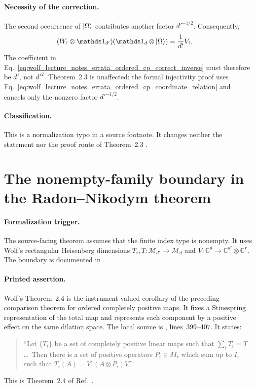 \documentclass{article}
\begin{document}
\paragraph{Necessity of the correction.}
The second occurrence of $|\Omega\rangle$ contributes another factor
$d'^{-1/2}$. Consequently,
\begin{align}
    (W_i\otimes\one_{d'})
    (\one_d\otimes\ket{\Omega})
        &=\frac{1}{d'}V_i.
    \label{eq:wolf_lecture_notes_errata_ordered_cp_unscaled_inverse}
\end{align}
The coefficient in
Eq.~\ref{eq:wolf_lecture_notes_errata_ordered_cp_correct_inverse} must
therefore be $d'$, not $d'^2$. Theorem~2.3 is unaffected: the formal
injectivity proof uses
Eq.~\ref{eq:wolf_lecture_notes_errata_ordered_cp_coordinate_relation} and
cancels only the nonzero factor $d'^{-1/2}$.

\paragraph{Classification.}
This is a normalization typo in a source footnote. It changes neither the
statement nor the proof route of Theorem~2.3 \cite{Wolf2012Quantum}.

\section{The nonempty-family boundary in the Radon--Nikodym theorem}
\label{sec:radon-nikodym}

\paragraph{Formalization trigger.}
The source-facing theorem
 assumes that the finite index
type is nonempty. It uses Wolf's rectangular Heisenberg dimensions
$T_i,T:\mathcal M_{d'}\to\mathcal M_d$ and
$V:\mathbb C^d\to\mathbb C^{d'}\otimes\mathbb C^r$. The boundary is
documented in
.

\paragraph{Printed assertion.}
Wolf's Theorem~2.4 is the instrument-valued corollary of the preceding
comparison theorem for ordered completely positive maps. It fixes a
Stinespring representation of the total map and represents each component by
a positive effect on the same dilation space. The local source is
, lines~399--407. It
states:
\begin{quote}
``Let $\{T_i\}$ be a set of completely positive linear maps such that
$\sum_iT_i=T$ \ldots\ Then there is a set of positive operators $P_i\in M_r$
which sum up to $I_r$ such that
$T_i(A)=V^\dagger(A\otimes P_i)V$.''
\end{quote}
This is Theorem~2.4 of Ref.~\cite{Wolf2012Quantum}.
\end{document}
